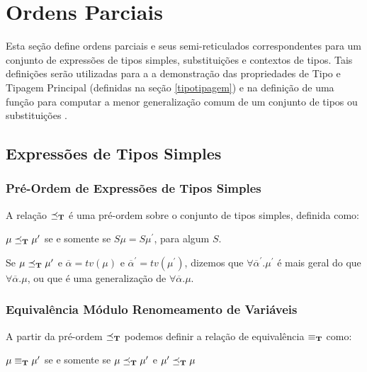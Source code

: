 \section{Ordens Parciais}\label{preordem}

Esta se\c{c}\~ao define ordens parciais e seus semi-reticulados correspondentes \cite{Davey90} para um conjunto de
express\~oes de tipos simples, substitui\c{c}\~oes e contextos de tipos. Tais defini\c{c}\~oes ser\~ao utilizadas para a
a demonstra\c{c}\~ao das propriedades de Tipo e Tipagem Principal (definidas na se\c{c}\~ao \ref{tipotipagem}) e na
defini\c{c}\~ao de uma fun\c{c}\~ao para computar a menor generaliza\c{c}\~ao comum de um conjunto de tipos ou 
substitui\c{c}\~oes \cite{Camarao99a}.

\subsection{Express\~oes de Tipos Simples}

\subsubsection{Pr\'e-Ordem de Express\~oes de Tipos Simples}

A rela\c{c}\~ao $\preceq_{\text{\textbf{T}}}$ \'e uma pr\'e-ordem sobre o conjunto de tipos simples, definida como:
\begin{center}
   $\mu\preceq_{\text{\textbf{T}}}\mu^{\prime}$ se e somente se $S\mu = S\mu^{\prime}$, para algum $S$.
\end{center} 

Se $\mu\preceq_{\text{\textbf{T}}}\mu^{\prime}$ e $\overline{\alpha}=tv(\mu)$ e 
$\overline{\alpha}^{\prime}=tv(\mu^{\prime})$, dizemos que $\forall\overline{\alpha}^{\prime}.\mu^{\prime}$ \'e mais 
geral do que $\forall\overline{\alpha}.\mu$, ou que \'e uma generaliza\c{c}\~ao de $\forall\overline{\alpha}.\mu$.

\subsubsection{Equival\^encia M\'odulo Renomeamento de Vari\'aveis}

A partir da pr\'e-ordem  $\preceq_{\text{\textbf{T}}}$ podemos definir a rela\c{c}\~ao de equival\^encia 
$\equiv_{\text{\textbf{T}}}$ como:
\begin{center}
	$\mu\equiv_{\text{\textbf{T}}}\mu^{\prime}$ se e somente se  $\mu\preceq_{\text{\textbf{T}}}\mu^{\prime}$ e
	 $\mu^{\prime}\preceq_{\text{\textbf{T}}}\mu$
\end{center}

